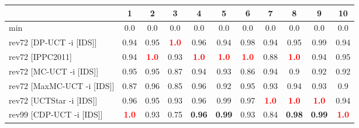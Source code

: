 \documentclass{article}
\begin{document}
\begin{tabular}{|l|r@{$\pm$}rr@{$\pm$}rr@{$\pm$}rr@{$\pm$}rr@{$\pm$}rr@{$\pm$}rr@{$\pm$}rr@{$\pm$}rr@{$\pm$}rr@{$\pm$}r|}
\hline

& \multicolumn{2}{c}{1}
& \multicolumn{2}{c}{2}
& \multicolumn{2}{c}{3}
& \multicolumn{2}{c}{4}
& \multicolumn{2}{c}{5}
& \multicolumn{2}{c}{6}
& \multicolumn{2}{c}{7}
& \multicolumn{2}{c}{8}
& \multicolumn{2}{c}{9}
& \multicolumn{2}{c|}{10}
\\
\hline
\hline
min
& \multicolumn{2}{c}{0.0}
& \multicolumn{2}{c}{0.0}
& \multicolumn{2}{c}{0.0}
& \multicolumn{2}{c}{0.0}
& \multicolumn{2}{c}{0.0}
& \multicolumn{2}{c}{0.0}
& \multicolumn{2}{c}{0.0}
& \multicolumn{2}{c}{0.0}
& \multicolumn{2}{c}{0.0}
& \multicolumn{2}{c|}{0.0}
\\
rev72 [DP-UCT -i [IDS]]
& \multicolumn{2}{c}{0.94}
& \multicolumn{2}{c}{0.95}
& \multicolumn{2}{c}{\textbf{\textcolor{red}{1.0}}}
& \multicolumn{2}{c}{0.96}
& \multicolumn{2}{c}{0.94}
& \multicolumn{2}{c}{0.98}
& \multicolumn{2}{c}{0.94}
& \multicolumn{2}{c}{0.95}
& \multicolumn{2}{c}{0.99}
& \multicolumn{2}{c|}{0.94}
\\
rev72 [IPPC2011]
& \multicolumn{2}{c}{0.94}
& \multicolumn{2}{c}{\textbf{\textcolor{red}{1.0}}}
& \multicolumn{2}{c}{0.93}
& \multicolumn{2}{c}{\textbf{\textcolor{red}{1.0}}}
& \multicolumn{2}{c}{\textbf{\textcolor{red}{1.0}}}
& \multicolumn{2}{c}{\textbf{\textcolor{red}{1.0}}}
& \multicolumn{2}{c}{0.88}
& \multicolumn{2}{c}{\textbf{\textcolor{red}{1.0}}}
& \multicolumn{2}{c}{0.94}
& \multicolumn{2}{c|}{0.95}
\\
rev72 [MC-UCT -i [IDS]]
& \multicolumn{2}{c}{0.95}
& \multicolumn{2}{c}{0.95}
& \multicolumn{2}{c}{0.87}
& \multicolumn{2}{c}{0.94}
& \multicolumn{2}{c}{0.93}
& \multicolumn{2}{c}{0.86}
& \multicolumn{2}{c}{0.94}
& \multicolumn{2}{c}{0.9}
& \multicolumn{2}{c}{0.92}
& \multicolumn{2}{c|}{0.92}
\\
rev72 [MaxMC-UCT -i [IDS]]
& \multicolumn{2}{c}{0.87}
& \multicolumn{2}{c}{0.96}
& \multicolumn{2}{c}{0.85}
& \multicolumn{2}{c}{0.96}
& \multicolumn{2}{c}{0.92}
& \multicolumn{2}{c}{0.95}
& \multicolumn{2}{c}{0.93}
& \multicolumn{2}{c}{0.94}
& \multicolumn{2}{c}{0.93}
& \multicolumn{2}{c|}{0.9}
\\
rev72 [UCTStar -i [IDS]]
& \multicolumn{2}{c}{0.96}
& \multicolumn{2}{c}{0.95}
& \multicolumn{2}{c}{0.93}
& \multicolumn{2}{c}{0.96}
& \multicolumn{2}{c}{0.99}
& \multicolumn{2}{c}{0.97}
& \multicolumn{2}{c}{\textbf{\textcolor{red}{1.0}}}
& \multicolumn{2}{c}{\textbf{\textcolor{red}{1.0}}}
& \multicolumn{2}{c}{\textbf{\textcolor{red}{1.0}}}
& \multicolumn{2}{c|}{0.94}
\\
\hline
rev99 [CDP-UCT -i [IDS]]
& \multicolumn{2}{c}{\textbf{\textcolor{red}{1.0}}}
& \multicolumn{2}{c}{0.93}
& \multicolumn{2}{c}{0.75}
& \multicolumn{2}{c}{\textbf{0.96}}
& \multicolumn{2}{c}{\textbf{0.99}}
& \multicolumn{2}{c}{0.93}
& \multicolumn{2}{c}{0.84}
& \multicolumn{2}{c}{\textbf{0.98}}
& \multicolumn{2}{c}{\textbf{0.99}}
& \multicolumn{2}{c|}{\textbf{\textcolor{red}{1.0}}}
\\
\hline
\end{tabular}%
\end{document}
